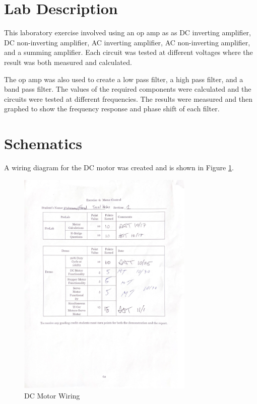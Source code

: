 \documentclass[CMPE]{KGCOEReport}
\begin{document}
\maketitle

\section*{Lab Description}

This laboratory exercise involved using an op amp as as DC inverting amplifier, DC non-inverting amplifier, AC inverting amplifier, AC non-inverting amplifier, and a summing amplifier. Each circuit was tested at different voltages where the result was both measured and calculated.

The op amp was also used to create a low pass filter, a high pass filter, and a band pass filter. The values of the required components were calculated and the circuits were tested at different frequencies. The results were measured and then graphed to show the frequency response and phase shift of each filter.

\section*{Schematics}

A wiring diagram for the DC motor was created and is shown in Figure \ref{fig:DCMotorWiring}.

\begin{figure}[H]
    \centering
    \includegraphics[width=0.75\textwidth]{signoff.pdf}
    \caption{DC Motor Wiring}
    \label{fig:DCMotorWiring}
\end{figure}
\end{document}
